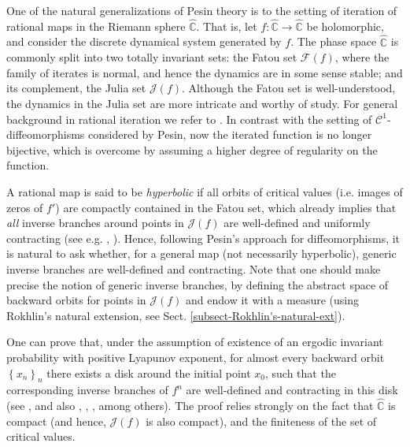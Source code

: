 \documentclass[11pt]{article}
\theoremstyle{definition}
\theoremstyle{remark}
\theoremstyle{plain}
\begin{document}
One of the natural generalizations of Pesin theory is to the setting of iteration of rational maps in the Riemann sphere $ \widehat{\mathbb{C}} $. That is, let $ f\colon\widehat{\mathbb{C}}\to\widehat{\mathbb{C} } $ be holomorphic, and consider the discrete dynamical system generated by $ f $. The phase space $ \widehat{\mathbb{C}} $ is commonly split into two totally invariant sets: the Fatou set $ \mathcal{F}(f) $, where the family of iterates is normal, and hence the dynamics are in some sense stable; and its complement, the Julia set $ \mathcal{J}(f) $. Although the Fatou set is well-understood, the dynamics in the Julia set are more intricate  and worthy of study. For general background in rational iteration we refer to \cite{CarlesonGamelin,milnor}.
In contrast with the setting of $ \mathcal{C}^1 $-diffeomorphisms considered by Pesin, now the iterated function is no longer bijective, which is overcome by assuming a higher degree of regularity on the function. 

A rational map is said to be {\em hyperbolic}  if all orbits of critical values (i.e. images of zeros of $ f' $) are compactly contained in the Fatou set, which already implies that \textit{all} inverse branches around points in $ \mathcal{J}(f) $ are well-defined and uniformly contracting (see e.g. \cite[Sect. V.2]{CarlesonGamelin}, \cite[Sect. 19]{milnor}). Hence, following Pesin's approach for diffeomorphisms, it is natural to ask whether, for a general map (not necessarily hyperbolic), generic inverse branches are well-defined and contracting.
Note that one should make precise the notion of generic inverse branches, by defining  the abstract space of backward orbits for points in $ \mathcal{J}(f) $ and endow it with a measure (using Rokhlin's natural extension, see Sect. \ref{subsect-Rokhlin's-natural-ext}). 

One can prove that, under the assumption of existence of an ergodic invariant probability with positive Lyapunov exponent, for almost every backward orbit $ \left\lbrace x_n\right\rbrace _n $ there exists a disk around the initial point $ x_0 $, such that the corresponding inverse branches of $ f^n $ are well-defined and contracting in this disk (see \cite{Ledrappier,DobbsP}, and also \cite[Sect. 11.2]{PrzytyckiUrbanski}, \cite[Chap. 9.3]{KotusUrbanski}, \cite[Sect. 28.3]{UrbanskiRoyMunday3}, among others). The proof relies strongly on the fact that $ \widehat{\mathbb{C} } $ is compact (and hence, $ \mathcal{J}(f) $ is also compact), and the finiteness of the set of critical values.
\end{document}
